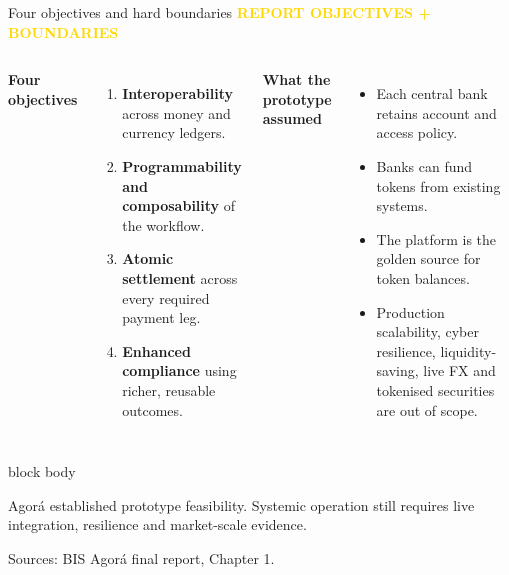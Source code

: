 \documentclass[aspectratio=169,12pt]{beamer}
\newcommand{\rust}[1]{\textcolor{Rust}{\textbf{#1}}}
\newcommand{\blue}[1]{\textcolor{Ocean}{\textbf{#1}}}
\newcommand{\source}[1]{\vfill\par\fontsize{5.4}{6.5}\selectfont\color{Quiet}Sources: #1}
\newcommand{\verytightitems}{\setlength{\itemsep}{0.22em}\setlength{\parskip}{0pt}}
\newcommand{\reporttag}[1]{\textcolor{Gold}{\fontsize{7.2}{8.5}\selectfont\bfseries REPORT #1}}
\newenvironment{statement}{%
  \begin{beamercolorbox}[sep=.18cm,rounded=false,wd=\linewidth]{block body}%
  \fontsize{13}{15.5}\selectfont\bfseries
}{\end{beamercolorbox}}
\begin{document}
\begin{frame}[shrink=30]{Four objectives and hard boundaries}
  \reporttag{OBJECTIVES + BOUNDARIES}\par\vspace{0.10cm}
  \begin{columns}[T,onlytextwidth]
      \rust{Four objectives}
      \begin{enumerate}\verytightitems
        \item \textbf{Interoperability} across money and currency ledgers.
        \item \textbf{Programmability and composability} of the workflow.
        \item \textbf{Atomic settlement} across every required payment leg.
        \item \textbf{Enhanced compliance} using richer, reusable outcomes.
      \end{enumerate}
      \blue{What the prototype assumed}
      \begin{itemize}\verytightitems
        \item Each central bank retains account and access policy.
        \item Banks can fund tokens from existing systems.
        \item The platform is the golden source for token balances.
        \item Production scalability, cyber resilience, liquidity-saving, live FX and tokenised securities are out of scope.
      \end{itemize}
  \end{columns}
  \begin{statement}
    Agor\'a established prototype feasibility. Systemic operation still requires live integration, resilience and market-scale evidence.
  \end{statement}
  \source{BIS Agor\'a final report, Chapter 1.}
\end{frame}
\end{document}
